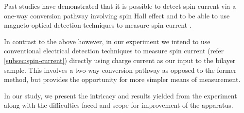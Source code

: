 Past studies have demonstrated that it is possible to detect spin current via a one-way conversion pathway involving spin Hall effect and to be able to use magneto-optical detection techniques to measure spin current \cite{Stamm_2017, valenzuela2007electrical}.

In contrast to the above however, in our experiment we intend to use conventional electrical detection techniques to measure spin current (refer \cref{subsec:spin-current}) directly using charge current as our input to the bilayer sample.
This involves a two-way conversion pathway as opposed to the former method, but provides the opportunity for more simpler means of measurement.

In our study, we present the intricacy and results yielded from the experiment along with the difficulties faced and scope for improvement of the apparatus.
